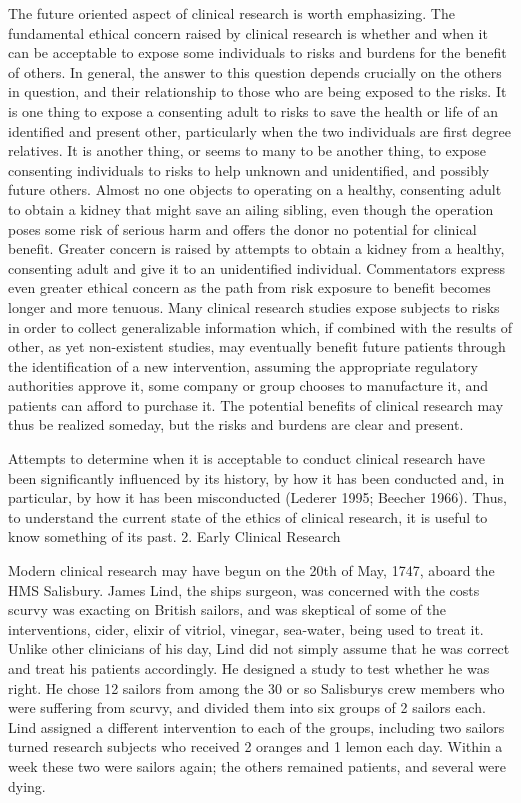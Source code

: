 \documentclass[12p]{article}
\begin{document}
The future oriented aspect of clinical research is worth emphasizing. The fundamental ethical concern raised by clinical research is whether and when it can be acceptable to expose some individuals to risks and burdens for the benefit of others. In general, the answer to this question depends crucially on the others in question, and their relationship to those who are being exposed to the risks. It is one thing to expose a consenting adult to risks to save the health or life of an identified and present other, particularly when the two individuals are first degree relatives. It is another thing, or seems to many to be another thing, to expose consenting individuals to risks to help unknown and unidentified, and possibly future others. Almost no one objects to operating on a healthy, consenting adult to obtain a kidney that might save an ailing sibling, even though the operation poses some risk of serious harm and offers the donor no potential for clinical benefit. Greater concern is raised by attempts to obtain a kidney from a healthy, consenting adult and give it to an unidentified individual. Commentators express even greater ethical concern as the path from risk exposure to benefit becomes longer and more tenuous. Many clinical research studies expose subjects to risks in order to collect generalizable information which, if combined with the results of other, as yet non-existent studies, may eventually benefit future patients through the identification of a new intervention, assuming the appropriate regulatory authorities approve it, some company or group chooses to manufacture it, and patients can afford to purchase it. The potential benefits of clinical research may thus be realized someday, but the risks and burdens are clear and present.

Attempts to determine when it is acceptable to conduct clinical research have been significantly influenced by its history, by how it has been conducted and, in particular, by how it has been misconducted (Lederer 1995; Beecher 1966). Thus, to understand the current state of the ethics of clinical research, it is useful to know something of its past.
2. Early Clinical Research

Modern clinical research may have begun on the 20th of May, 1747, aboard the HMS Salisbury. James Lind, the ships surgeon, was concerned with the costs scurvy was exacting on British sailors, and was skeptical of some of the interventions, cider, elixir of vitriol, vinegar, sea-water, being used to treat it. Unlike other clinicians of his day, Lind did not simply assume that he was correct and treat his patients accordingly. He designed a study to test whether he was right. He chose 12 sailors from among the 30 or so Salisburys crew members who were suffering from scurvy, and divided them into six groups of 2 sailors each. Lind assigned a different intervention to each of the groups, including two sailors turned research subjects who received 2 oranges and 1 lemon each day. Within a week these two were sailors again; the others remained patients, and several were dying.
\end{document}
